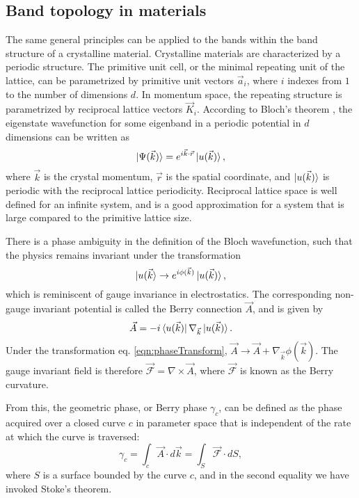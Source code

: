\subsection{Band topology in materials}
The same general principles can be applied to the bands within the band structure of a crystalline material. Crystalline materials are characterized by a periodic structure. The primitive unit cell, or the minimal repeating unit of the lattice, can be parametrized by primitive unit vectors $\vec{a}_i$, where $i$ indexes from $1$ to the number of dimensions $d$. In momentum space, the repeating structure is parametrized by reciprocal lattice vectors $\vec{K}_i$. According to Bloch's theorem \cite{Ashcroft}, the eigenstate wavefunction for some eigenband in a periodic potential in $d$ dimensions can be written as 
\begin{equation}
\mathinner{|{\Psi(\vec{k})}\rangle} = e^{i\vec{k}\cdot\vec{r}}\mathinner{|{u(\vec{k})}\rangle},
\end{equation}
where $\vec{k}$ is the crystal momentum, $\vec{r}$ is the spatial coordinate, and $\mathinner{|{u(\vec{k})}\rangle}$ is periodic with the reciprocal lattice periodicity. Reciprocal lattice space is well defined for an infinite system, and is a good approximation for a system that is large compared to the primitive lattice size.

There is a phase ambiguity in the definition of the Bloch wavefunction, such that the physics remains invariant under the transformation 
\begin{equation}
\mathinner{|{u(\vec{k}}\rangle} \rightarrow e^{i\phi(\vec{k})}\mathinner{|{u(\vec{k})}\rangle},
\label{eqn:phaseTransform}
\end{equation}
which is reminiscent of gauge invariance in electrostatics. The corresponding non-gauge invariant potential is called the Berry connection $\vec{A}$, and is given by 
\begin{equation}
\vec{A}=-i\mathinner{\langle{u(\vec{k})}|}\nabla_{\vec{k}}\mathinner{|{u(\vec{k})}\rangle}.
\end{equation}
Under the transformation eq. \ref{eqn:phaseTransform}, $\vec{A} \rightarrow \vec{A} + \nabla_{\vec{k}}\phi(\vec{k})$. The gauge invariant field is therefore $\vec{\mathcal{F}}=\nabla\times\vec{A}$, where $\vec{\mathcal{F}}$ is known as the Berry curvature. 

From this, the geometric phase, or Berry phase\cite{Berry1984} $\gamma_c$, can be defined as the phase acquired over a closed curve $c$  in parameter space that is independent of the rate at which the curve is traversed:
\begin{equation}
\gamma_c = \int_c \vec{A}\cdot d\vec{k} = \int_S \vec{\mathcal{F}}\cdot dS,
\label{eqn:BerryPhase}
\end{equation}
where $S$ is a surface bounded by the  curve $c$, and in the second equality we have invoked Stoke's theorem. 

